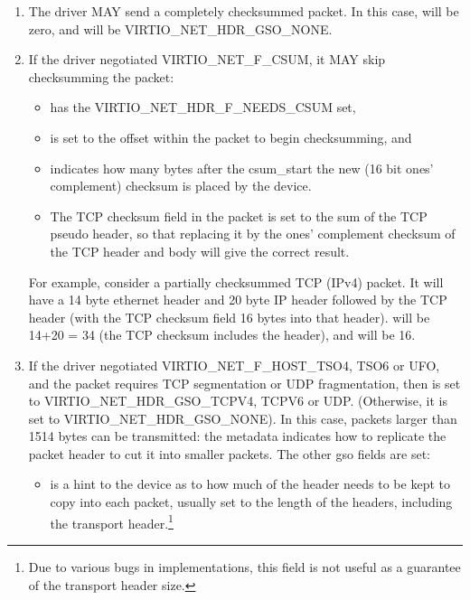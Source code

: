 \begin{enumerate}
\item The driver MAY send a completely checksummed packet.  In this case,
   will be zero, and  will be VIRTIO_NET_HDR_GSO_NONE.

\item If the driver negotiated VIRTIO_NET_F_CSUM, it MAY skip
  checksumming the packet:
  \begin{itemize}
  \item {} has the VIRTIO_NET_HDR_F_NEEDS_CSUM set,

  \item {} is set to the offset within the packet to begin checksumming,
    and

  \item {} indicates how many bytes after the csum_start the
    new (16 bit ones' complement) checksum is placed by the device.

  \item The TCP checksum field in the packet is set to the sum
    of the TCP pseudo header, so that replacing it by the ones'
    complement checksum of the TCP header and body will give the
    correct result.
  \end{itemize}

\begin{note}
For example, consider a partially checksummed TCP (IPv4) packet.
It will have a 14 byte ethernet header and 20 byte IP header
followed by the TCP header (with the TCP checksum field 16 bytes
into that header).  will be 14+20 = 34 (the TCP
checksum includes the header), and  will be 16.
\end{note}

\item If the driver negotiated
  VIRTIO_NET_F_HOST_TSO4, TSO6 or UFO, and the packet requires
  TCP segmentation or UDP fragmentation, then 
  is set to VIRTIO_NET_HDR_GSO_TCPV4, TCPV6 or UDP.
  (Otherwise, it is set to VIRTIO_NET_HDR_GSO_NONE). In this
  case, packets larger than 1514 bytes can be transmitted: the
  metadata indicates how to replicate the packet header to cut it
  into smaller packets. The other gso fields are set:

  \begin{itemize}
  \item {} is a hint to the device as to how much of the header
    needs to be kept to copy into each packet, usually set to the
    length of the headers, including the transport header.\footnote{Due to various bugs in implementations, this field is not useful
as a guarantee of the transport header size.
}


\end{itemize}
\end{enumerate}
